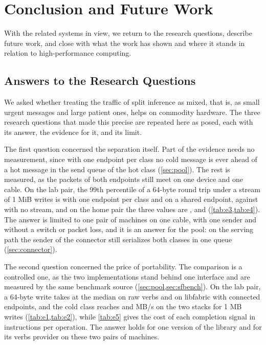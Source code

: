 \chapter{Conclusion and Future Work}
\label{ch:conclusion}

With the related systems in view, we return to the research questions,
describe future work, and close with what the work has shown and where it
stands in relation to high-performance computing.

\section{Answers to the Research Questions}
\label{sec:answers}

We asked whether treating the traffic of split inference as mixed, that is,
as small urgent messages and large patient ones, helps on commodity hardware.
The three research questions that made this precise are repeated here as
posed, each with its answer, the evidence for it, and its limit.

The first question concerned the separation itself. \emph{\rqone}
 Part of the evidence needs no measurement,
since with one endpoint per class no cold message is ever ahead of a hot
message in the send queue of the hot class (\cref{sec:pool}). The rest is
measured, as the packets of both endpoints still meet on one device and one
cable. On the lab
pair, the 99th percentile of a 64-byte round trip under a stream of 1 MiB
writes is \blank\us{} with one endpoint per class and \blank\us{} on a shared
endpoint, against \blank\us{} with no stream, and on the home pair the three
values are \blank, \blank{} and \blank\us{} (\cref{tab:e3,tab:e4}). The
answer is limited to
one pair of machines on one cable, with one sender and without a switch or
packet loss, and it is an answer for the pool: on the serving path the sender
of the connector still serializes both classes in one queue
(\cref{sec:connector}).

The second question concerned the price of portability. \emph{\rqtwo}
 The comparison is a controlled one, as the two implementations stand behind
one interface and are measured by the same benchmark source
(\cref{sec:pool,sec:sfbench}). On the lab pair, a 64-byte write takes
\blank\us{} at the median on raw verbs and \blank\us{} on libfabric with
connected endpoints, and the cold class reaches \blank{} and \blank{} MB/s on
the two stacks for 1 MB writes (\cref{tab:e1,tab:e2}), while \cref{tab:e5}
gives the cost of each completion signal in instructions per operation. The
answer holds for one version of the library and for its verbs provider on
these two pairs of machines.

